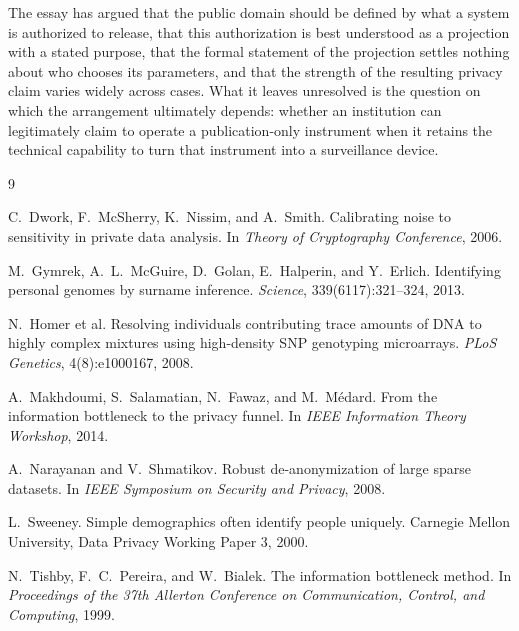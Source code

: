 \documentclass[11pt]{article}
\theoremstyle{definition}
\begin{document}
The essay has argued that the public domain should be defined by what a system is authorized to release, that this authorization is best understood as a projection with a stated purpose, that the formal statement of the projection settles nothing about who chooses its parameters, and that the strength of the resulting privacy claim varies widely across cases. What it leaves unresolved is the question on which the arrangement ultimately depends: whether an institution can legitimately claim to operate a publication-only instrument when it retains the technical capability to turn that instrument into a surveillance device.

\begin{thebibliography}{9}

C.~Dwork, F.~McSherry, K.~Nissim, and A.~Smith.
Calibrating noise to sensitivity in private data analysis.
In \emph{Theory of Cryptography Conference}, 2006.

M.~Gymrek, A.~L.~McGuire, D.~Golan, E.~Halperin, and Y.~Erlich.
Identifying personal genomes by surname inference.
\emph{Science}, 339(6117):321--324, 2013.

N.~Homer et al.
Resolving individuals contributing trace amounts of DNA to highly complex mixtures using high-density SNP genotyping microarrays.
\emph{PLoS Genetics}, 4(8):e1000167, 2008.

A.~Makhdoumi, S.~Salamatian, N.~Fawaz, and M.~M\'edard.
From the information bottleneck to the privacy funnel.
In \emph{IEEE Information Theory Workshop}, 2014.

A.~Narayanan and V.~Shmatikov.
Robust de-anonymization of large sparse datasets.
In \emph{IEEE Symposium on Security and Privacy}, 2008.

L.~Sweeney.
Simple demographics often identify people uniquely.
Carnegie Mellon University, Data Privacy Working Paper 3, 2000.

N.~Tishby, F.~C.~Pereira, and W.~Bialek.
The information bottleneck method.
In \emph{Proceedings of the 37th Allerton Conference on Communication, Control, and Computing}, 1999.

\end{thebibliography}
\end{document}
